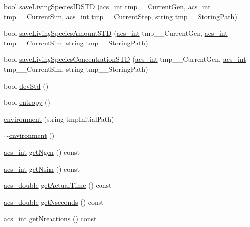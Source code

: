 \begin{DoxyCompactItemize}
\item 
bool \hyperlink{a00014_a623c3cda23a18cb7b039c5a666408d72}{save\-Living\-Species\-I\-D\-S\-T\-D} (\hyperlink{a00050_a8d277355641a098190360234e2ebde35}{acs\-\_\-int} tmp\-\_\-\-\_\-\-Current\-Gen, \hyperlink{a00050_a8d277355641a098190360234e2ebde35}{acs\-\_\-int} tmp\-\_\-\-\_\-\-Current\-Sim, \hyperlink{a00050_a8d277355641a098190360234e2ebde35}{acs\-\_\-int} tmp\-\_\-\-\_\-\-Current\-Step, string tmp\-\_\-\-\_\-\-Storing\-Path)
\item 
bool \hyperlink{a00014_a26c70b0a84c37c87952628d4a328c238}{save\-Living\-Species\-Amount\-S\-T\-D} (\hyperlink{a00050_a8d277355641a098190360234e2ebde35}{acs\-\_\-int} tmp\-\_\-\-\_\-\-Current\-Gen, \hyperlink{a00050_a8d277355641a098190360234e2ebde35}{acs\-\_\-int} tmp\-\_\-\-\_\-\-Current\-Sim, string tmp\-\_\-\-\_\-\-Storing\-Path)
\item 
bool \hyperlink{a00014_aedf8d90e1fe734948bf2213489840582}{save\-Living\-Species\-Concentration\-S\-T\-D} (\hyperlink{a00050_a8d277355641a098190360234e2ebde35}{acs\-\_\-int} tmp\-\_\-\-\_\-\-Current\-Gen, \hyperlink{a00050_a8d277355641a098190360234e2ebde35}{acs\-\_\-int} tmp\-\_\-\-\_\-\-Current\-Sim, string tmp\-\_\-\-\_\-\-Storing\-Path)
\item 
bool \hyperlink{a00014_ae7fd21d14f81c4854b3a6163b0278857}{dev\-Std} ()
\item 
bool \hyperlink{a00014_a4e9b60ec8b05e888cf0e55def03ee906}{entropy} ()
\item 
\hyperlink{a00014_aa44bbabec52bf2d61a19685a30e68de1}{environment} (string tmp\-Initial\-Path)
\item 
\hyperlink{a00014_ae323954bd5b674bf34d954c3f7b67629}{$\sim$environment} ()
\item 
\hyperlink{a00050_a8d277355641a098190360234e2ebde35}{acs\-\_\-int} \hyperlink{a00014_afad68362d5f4ec0689941e3c1b92c2e8}{get\-Ngen} () const 
\item 
\hyperlink{a00050_a8d277355641a098190360234e2ebde35}{acs\-\_\-int} \hyperlink{a00014_a5a8522899b3e84b9c394d5d83d1e5c63}{get\-Nsim} () const 
\item 
\hyperlink{a00050_ab776853a005fcbf56af0424a2a4dd607}{acs\-\_\-double} \hyperlink{a00014_a14bad649a73246617361f0e1765f49f8}{get\-Actual\-Time} () const 
\item 
\hyperlink{a00050_ab776853a005fcbf56af0424a2a4dd607}{acs\-\_\-double} \hyperlink{a00014_aa850c2805e508b2aac4fbd5d5f9de77b}{get\-Nseconds} () const 
\item 
\hyperlink{a00050_a8d277355641a098190360234e2ebde35}{acs\-\_\-int} \hyperlink{a00014_a5cb9cf3968f19e23f6c54f4c915cf878}{get\-Nreactions} () const 

\end{DoxyCompactItemize}
